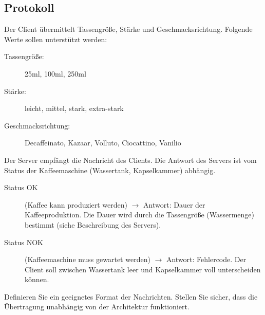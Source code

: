 \subsection*{Protokoll}
\label{sec:prot}
Der Client übermittelt Tassengröße, Stärke und Geschmacksrichtung. Folgende
Werte sollen unterstützt werden:
%
\begin{description}
\item[Tassengröße:] 25ml, 100ml, 250ml
\item[Stärke:] leicht, mittel, stark, extra-stark
\item[Geschmacksrichtung:] Decaffeinato, Kazaar, Volluto, Ciocattino, Vanilio
\end{description}

Der Server empfängt die Nachricht des Clients. Die Antwort des Servers ist vom
Status der Kaffeemaschine (Wassertank, Kapselkammer) abhängig.
%
\begin{description}
\item[Status OK] (Kaffee kann produziert werden) $\rightarrow$ Antwort: Dauer
  der Kaffeeproduktion. Die Dauer wird durch die Tassengröße (Wassermenge)
  bestimmt (siehe Beschreibung des Servers).
\item[Status NOK] (Kaffeemaschine muss gewartet werden) $\rightarrow$ Antwort:
  Fehlercode. Der Client soll zwischen Wassertank leer und Kapselkammer voll
  unterscheiden können.
\end{description}

Definieren Sie ein geeignetes Format der Nachrichten. Stellen Sie sicher, dass
die Übertragung unabhängig von der Architektur funktioniert.


\osueguidelinesone




